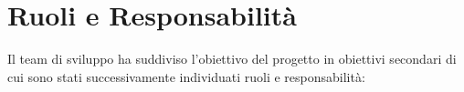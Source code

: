 \documentclass{report}
\begin{document}

\chapter{Ruoli e Responsabilità}
Il team di sviluppo ha suddiviso l’obiettivo del progetto in obiettivi secondari di cui sono stati successivamente individuati ruoli e responsabilità:
\end{document}
